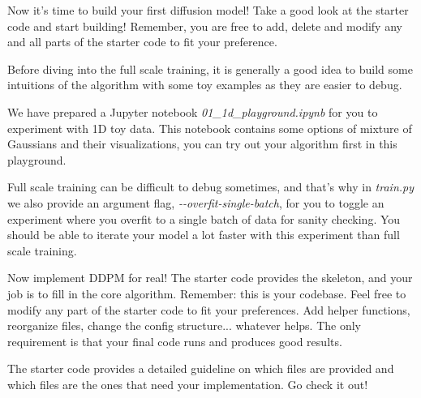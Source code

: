 
Now it's time to build your first diffusion model! Take a good look at the starter code and start building! Remember, you are free to add, delete and modify any and all parts of the starter code to fit your preference.


Before diving into the full scale training, it is generally a good idea to build some intuitions of the algorithm with some toy examples as they are easier to debug.

 We have prepared a Jupyter notebook \textit{01\_1d\_playground.ipynb} for you to experiment with 1D toy data. This notebook contains some options of mixture of Gaussians and their visualizations, you can try out your algorithm first in this playground.

 Full scale training can be difficult to debug sometimes, and that's why in \textit{train.py} we also provide an argument flag, \textit{-\--overfit-single-batch}, for you to toggle an experiment where you overfit to a single batch of data for sanity checking. You should be able to iterate your model a lot faster with this experiment than full scale training.


Now implement DDPM for real! The starter code provides the skeleton, and your job is to fill in the core algorithm.
Remember: this is your codebase. Feel free to modify any part of the starter code to fit your preferences. Add helper functions, reorganize files, change the config structure... whatever helps. The only requirement is that your final code runs and produces good results.

The starter code provides a detailed guideline on which files are provided and which files are the ones that need your implementation. Go check it out!

